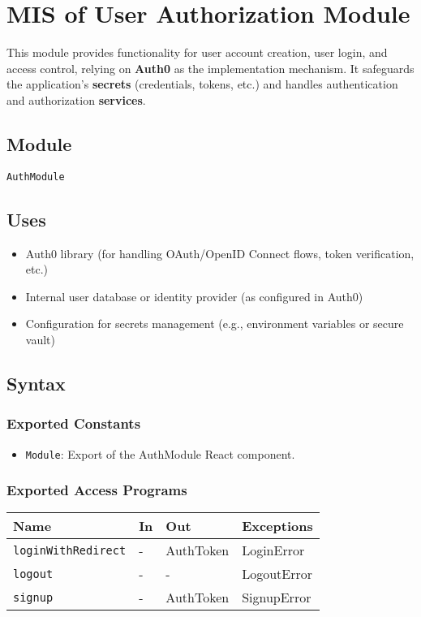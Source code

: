 \documentclass[12pt, titlepage]{article}
\begin{document}
\section{MIS of User Authorization Module} \label{AuthModule}

This module provides functionality for user account creation, user login, and
access control, relying on \textbf{Auth0} as the implementation mechanism. It
safeguards the application’s \textbf{secrets} (credentials, tokens, etc.) and
handles authentication and authorization \textbf{services}.

\subsection{Module}

\texttt{AuthModule}

\subsection{Uses}

\begin{itemize}
    \item Auth0 library (for handling OAuth/OpenID Connect flows, token verification, etc.)
    \item Internal user database or identity provider (as configured in Auth0)
    \item Configuration for secrets management (e.g., environment variables or secure vault)
\end{itemize}

\subsection{Syntax}

\subsubsection{Exported Constants}

\begin{itemize}
    \item \texttt{Module}: Export of the AuthModule React component.
\end{itemize}

\subsubsection{Exported Access Programs}

\begin{center}
\begin{tabular}{p{5cm} p{3.5cm} p{3.5cm} p{2cm}}
\hline
\textbf{Name} & \textbf{In} & \textbf{Out} & \textbf{Exceptions} \\
\hline
\texttt{loginWithRedirect} & - & AuthToken & LoginError \\
\texttt{logout} & - & - & LogoutError \\
\texttt{signup} & - & AuthToken & SignupError \\
\hline
\end{tabular}
\end{center}
\end{document}
